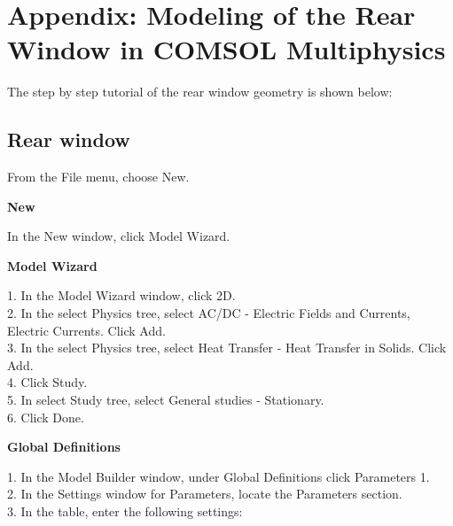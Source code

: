\appendix

\section*{Appendix: Modeling of the Rear Window in COMSOL Multiphysics}

The step by step tutorial of the rear window geometry is shown below:

\subsection*{Rear window}

From the File menu, choose New.

\textbf{New}

In the New window, click Model Wizard.

\textbf{Model Wizard}

1. In the Model Wizard window, click 2D.\\
2. In the select Physics tree, select AC/DC - Electric Fields and Currents, Electric Currents. Click Add.\\
3. In the select Physics tree, select Heat Transfer - Heat Transfer in Solids. Click Add.\\
4. Click Study.\\
5. In select Study tree, select General studies - Stationary.\\
6. Click Done.

\textbf{Global Definitions}

1. In the Model Builder window, under Global Definitions click Parameters 1.\\
2. In the Settings window for Parameters, locate the Parameters section.\\
3. In the table, enter the following settings:

